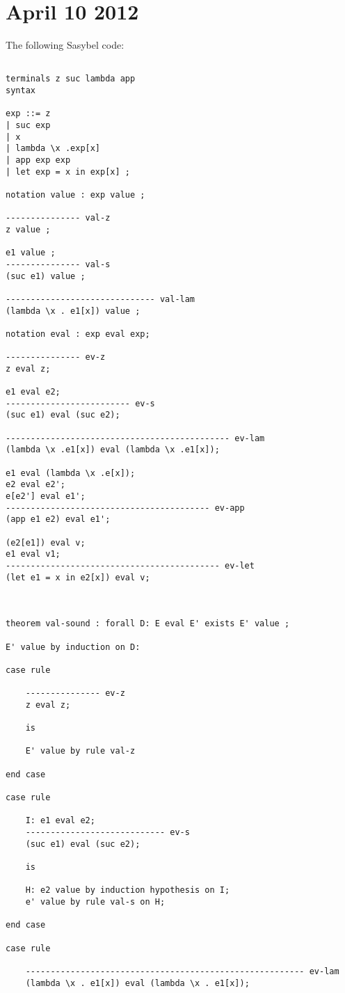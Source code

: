 \documentclass[12pt]{article}
\begin{document}
\section{April 10 2012}
The following \textmd{Sasybel} code:
\footnotesize\begin{verbatim}

terminals z suc lambda app
syntax

exp ::= z
| suc exp
| x
| lambda \x .exp[x]
| app exp exp
| let exp = x in exp[x] ;

notation value : exp value ;

--------------- val-z
z value ;

e1 value ;
--------------- val-s
(suc e1) value ;

------------------------------ val-lam
(lambda \x . e1[x]) value ;

notation eval : exp eval exp;

--------------- ev-z
z eval z;

e1 eval e2;
------------------------- ev-s
(suc e1) eval (suc e2);

--------------------------------------------- ev-lam
(lambda \x .e1[x]) eval (lambda \x .e1[x]);

e1 eval (lambda \x .e[x]);
e2 eval e2';
e[e2'] eval e1';
----------------------------------------- ev-app
(app e1 e2) eval e1';

(e2[e1]) eval v;
e1 eval v1;
------------------------------------------- ev-let
(let e1 = x in e2[x]) eval v;



theorem val-sound : forall D: E eval E' exists E' value ;

E' value by induction on D:

case rule

	--------------- ev-z
	z eval z;

	is

	E' value by rule val-z

end case

case rule

	I: e1 eval e2;
	---------------------------- ev-s
	(suc e1) eval (suc e2);

	is

	H: e2 value by induction hypothesis on I;
	e' value by rule val-s on H;

end case

case rule

	-------------------------------------------------------- ev-lam
	(lambda \x . e1[x]) eval (lambda \x . e1[x]);


\end{verbatim}
\end{document}
